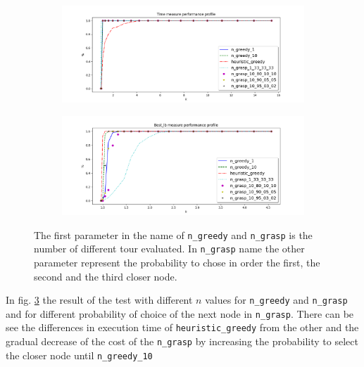 \begin{figure}[!h]
	\centering
	\begin{subfigure}{.75\textwidth}
		\includegraphics[width=\columnwidth]{../res/Lgrasp_greedy_time.png}
		\caption{}
		\label{fig:Lgrasp_greedy_time}
	\end{subfigure}
	\begin{subfigure}{.75\textwidth}
		\includegraphics[width=\columnwidth]{../res/Lgrasp_greedy_lb.png}
		\caption{}
		\label{fig:Lgrasp_greedy_lb}
	\end{subfigure}
\caption{The first parameter in the name of \texttt{n\_greedy} and \texttt{n\_grasp} is the number of different tour evaluated. In \texttt{n\_grasp} name the other parameter represent the probability to chose in order the first, the second and the third closer node.  }
\label{fig:Lgrasp_greedy}
\end{figure}
In fig. \ref{fig:Lgrasp_greedy} the result of the test with different $ n $ values for \texttt{n\_greedy} and \texttt{n\_grasp} and for different probability of choice of the next node in \texttt{n\_grasp}. There can be see the differences in execution time of \texttt{heuristic\_greedy} from the other and the gradual decrease of the cost of the \texttt{n\_grasp} by increasing the probability to select the closer node until \texttt{n\_greedy\_10}    

